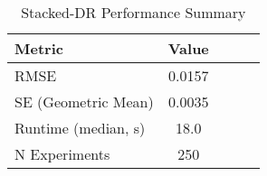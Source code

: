 \begin{table}[htbp]
\centering
\caption{Stacked-DR Performance Summary}
\label{tab:stacking}
\begin{tabular}{l|cccc}
\toprule
Metric & Value \\
\midrule
RMSE & 0.0157 \\
SE (Geometric Mean) & 0.0035 \\
Runtime (median, s) & 18.0 \\
N Experiments & 250 \\
\bottomrule
\end{tabular}
\end{table}